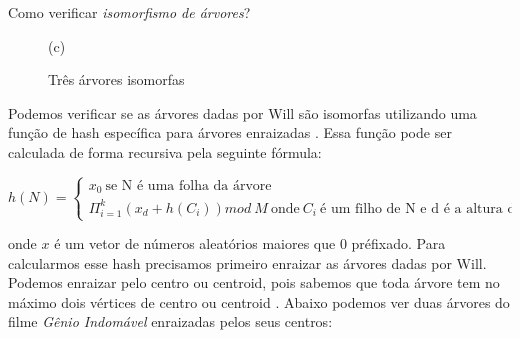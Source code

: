 \documentclass{beamer}
\begin{document}
\begin{frame}
\begin{columns}[t]
\begin{column}{.5\textwidth}
\begin{block}{Como verificar \emph{isomorfismo de árvores}?}
\begin{figure}
\begin{minipage}{0.3333\textwidth}
{
        }
        
        (c)
      \end{minipage}

      \caption{Três árvores isomorfas}
      \label{fig:isomorfas}
    \end{figure}

    Podemos verificar se as árvores dadas por Will são isomorfas utilizando uma função de hash específica para árvores enraizadas \cite{TreeIsomorphism}. Essa função pode ser calculada de forma recursiva pela seguinte fórmula:

    \[ h(N) = \begin{cases} x_0 ~\text{se N é uma folha da árvore} \\
        \Pi_{i = 1}^{k} (x_d + h(C_i)) mod ~M ~\text{onde} ~C_i ~\text{é um filho de N e d é a altura de N,}
      \end{cases} \]

   onde \( x \) é um vetor de números aleatórios maiores que 0 préfixado. Para calcularmos esse hash precisamos primeiro enraizar as árvores dadas por Will. Podemos enraizar pelo centro ou centroid, pois sabemos que toda árvore tem no máximo dois vértices de centro ou centroid \cite{Centroid}. Abaixo podemos ver duas árvores do filme \textit{Gênio Indomável} enraizadas pelos seus centros:

    \begin{figure}
      \begin{minipage}{0.5\textwidth}
        \centering
        

\end{minipage}
\end{figure}
\end{block}
\end{column}
\end{columns}
\end{frame}
\end{document}
